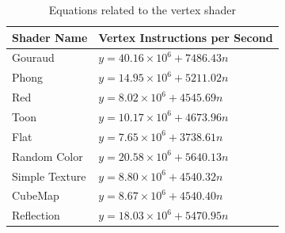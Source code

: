 \documentclass[10pt, conference, compsocconf]{IEEEtran}
\begin{document}
{\begin{table}[!t]
\centering
\caption{Equations related to the vertex shader}
\begin{tabular}{ll}
	\hline
	\textbf{Shader Name} & \textbf{Vertex Instructions per Second} \\
	\hline
	Gouraud & $y = 40.16 \times 10^6 + 7486.43n$  \\
	Phong &  $y = 14.95 \times 10^6 + 5211.02n$  \\
	Red & $y = 8.02 \times 10^6 + 4545.69n$ \\
	Toon & $y = 10.17 \times 10^6 + 4673.96n$ \\
	Flat & $y = 7.65 \times 10^6 + 3738.61n$ \\
	Random Color & $y = 20.58 \times 10^6 + 5640.13n$ \\
	Simple Texture & $y = 8.80 \times 10^6 + 4540.32n$ \\
	CubeMap & $y = 8.67 \times 10^6 + 4540.40n$ \\
	Reflection & $y = 18.03 \times 10^6 + 5470.95n$ \\
	\hline
\end{tabular}
\label{equation_nexus_vertex}
\end{table}

}
\end{document}
